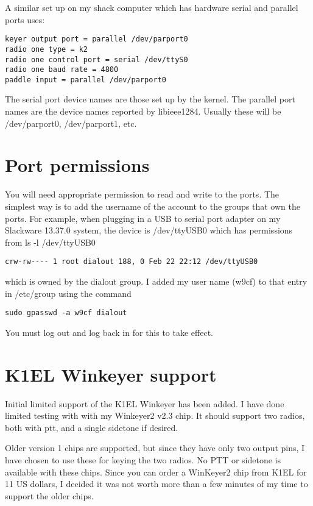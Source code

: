 \documentclass[12pt]{article}
\begin{document}
A similar set up on my shack computer which has hardware
serial and parallel ports uses:
\begin{verbatim}
keyer output port = parallel /dev/parport0
radio one type = k2
radio one control port = serial /dev/ttyS0
radio one baud rate = 4800
paddle input = parallel /dev/parport0
\end{verbatim}

The serial port device names are those set up by the kernel.
The parallel port names are the device names reported by
libieee1284. Usually these will be /dev/parport0, /dev/parport1, etc.

\section{Port permissions}
You will need appropriate
permission
to read and write to the ports.
The simplest way is to add the username of the account to the groups
that own the ports. For example, when plugging in a USB to serial
port adapter on my Slackware 13.37.0 system, the device is /dev/ttyUSB0
which has permissions from ls -l /dev/ttyUSB0
\begin{verbatim}
crw-rw---- 1 root dialout 188, 0 Feb 22 22:12 /dev/ttyUSB0
\end{verbatim}
which is owned by the dialout group.
I added my user name (w9cf) to
that entry in /etc/group using the command
\begin{verbatim}
sudo gpasswd -a w9cf dialout
\end{verbatim}
You must log out and log back in for this to take effect.

\section{K1EL Winkeyer support}
Initial limited support of the K1EL Winkeyer has been added.
I have done limited testing with
with my Winkeyer2 v2.3 chip. It should support two radios, both with
ptt, and a single sidetone if desired.

Older version 1 chips are supported, but since they have only two output
pins, I have chosen to use these for keying the two radios. No PTT or
sidetone is available with these chips. Since you can order a WinKeyer2
chip from K1EL for 11 US dollars, I decided it was not worth more than
a few minutes of my time to support the older chips.
\end{document}
